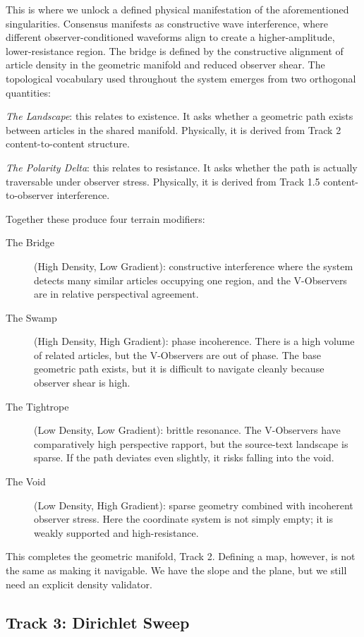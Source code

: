 This is where we unlock a defined physical manifestation of the aforementioned singularities. Consensus manifests as constructive wave interference, where different observer-conditioned waveforms align to create a higher-amplitude, lower-resistance region. The bridge is defined by the constructive alignment of article density in the geometric manifold and reduced observer shear. The topological vocabulary used throughout the system emerges from two orthogonal quantities:

\emph{The Landscape}: this relates to existence. It asks whether a geometric path exists between articles in the shared manifold. Physically, it is derived from Track 2 content-to-content structure.

\emph{The Polarity Delta}: this relates to resistance. It asks whether the path is actually traversable under observer stress. Physically, it is derived from Track 1.5 content-to-observer interference.

Together these produce four terrain modifiers:

\begin{description}
    \item[The Bridge] (High Density, Low Gradient): constructive interference where the system detects many similar articles occupying one region, and the V-Observers are in relative perspectival agreement.
    \item[The Swamp] (High Density, High Gradient): phase incoherence. There is a high volume of related articles, but the V-Observers are out of phase. The base geometric path exists, but it is difficult to navigate cleanly because observer shear is high.
    \item[The Tightrope] (Low Density, Low Gradient): brittle resonance. The V-Observers have comparatively high perspective rapport, but the source-text landscape is sparse. If the path deviates even slightly, it risks falling into the void.
    \item[The Void] (Low Density, High Gradient): sparse geometry combined with incoherent observer stress. Here the coordinate system is not simply empty; it is weakly supported and high-resistance.
\end{description}

This completes the geometric manifold, Track 2. Defining a map, however, is not the same as making it navigable. We have the slope and the plane, but we still need an explicit density validator.

\subsection{Track 3: Dirichlet Sweep}

